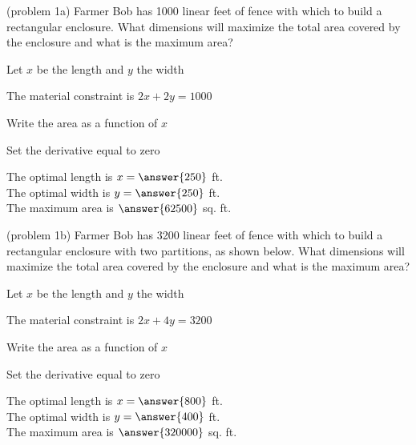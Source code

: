 \documentclass[handout]{ximera}
\begin{document}
\begin{problem}(problem 1a)
Farmer Bob has 1000 linear feet of fence with which to build a rectangular enclosure.  
What dimensions will maximize the total area covered by the enclosure and what is the maximum area?

\begin{hint}
Let $x$ be the length and $y$ the width
\end{hint}
\begin{hint}
The material constraint is $2x+2y = 1000$
\end{hint}
\begin{hint}
Write the area as a function of $x$
\end{hint}
\begin{hint}
Set the derivative equal to zero
\end{hint}

The optimal length is $x= \answer{250}$ ft.\\
The optimal width is $y = \answer{250}$ ft.\\
The maximum area is $\answer{62500}$ sq. ft.


\end{problem}


\begin{problem}(problem 1b)
Farmer Bob has 3200 linear feet of fence with which to build a rectangular enclosure with two partitions, as shown below.
What dimensions will maximize the total area covered by the enclosure and what is the maximum area?

\begin{center}
\end{center}
\begin{hint}
Let $x$ be the length and $y$ the width
\end{hint}
\begin{hint}
The material constraint is $2x+4y = 3200$
\end{hint}
\begin{hint}
Write the area as a function of $x$
\end{hint}
\begin{hint}
Set the derivative equal to zero
\end{hint}

The optimal length is $x= \answer{800}$ ft.\\
The optimal width is $y = \answer{400}$ ft.\\
The maximum area is $\answer{320000}$ sq. ft.
 
\end{problem}
\end{document}
